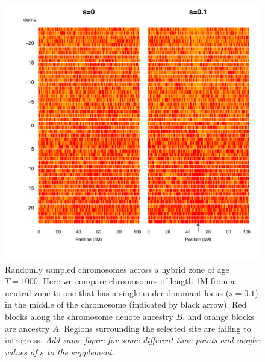 \documentclass[11pt,letterpaper]{article}
\newcommand{\plr}[1]{{\em \color{blue} #1}}
\begin{document}



\begin{figure}
\includegraphics[width=\textwidth]{figs/plot_chromosomes_tau1000}
\caption{Randomly sampled chromosomes  across a hybrid zone of age $T=1000$. Here we compare chromosomes of length 1M from a neutral zone to one that has a single under-dominant locus ($s=0.1$) in the middle of the chromosome (indicated by black arrow). Red blocks along the chromosome denote ancestry $B$, and orange blocks are ancestry $A$. Regions surrounding the selected site are failing to introgress.
    \plr{Add same figure for some different time points and maybe values of $s$ to the supplement.} 
}\label{Fig:resistanceToIntrogression1000g}
\end{figure}
\end{document}
